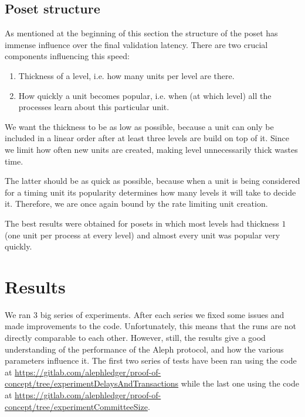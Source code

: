 \documentclass[a4paper,10pt]{article}
\begin{document}
		\subsection{Poset structure}
		 \label{ssec:posetShape}
			As mentioned at the beginning of this section the structure of the poset has immense influence over the final validation latency.
			There are two crucial components influencing this speed:
			\begin{enumerate}
				\item Thickness of a level, i.e. how many units per level are there.
				\item How quickly a unit becomes popular, i.e. when (at which level) all the processes learn about this particular unit.
			\end{enumerate}
			We want the thickness to be as low as possible, because a unit can only be included in a linear order after at least three levels are build on top of it.
			Since we limit how often new units are created, making level unnecessarily thick wastes time.

			The latter should be as quick as possible, because when a unit is being considered for a timing unit its popularity determines how many levels it will take to decide it.
		 Therefore, we are once again bound by the rate limiting unit creation.

			The best results were obtained for posets in which most levels had thickness $1$ (one unit per process at every level) and almost every unit was popular very quickly.
	\section{Results}
	 We ran 3 big series of experiments. After each series we fixed some issues and made improvements to the code.
		Unfortunately, this means that the runs are not directly comparable to each other.
		However, still, the results give a good understanding of the performance of the Aleph protocol, and how the various parameters influence it.
		The first two series of tests have been ran using the code at \url{https://gitlab.com/alephledger/proof-of-concept/tree/experimentDelaysAndTransactions}
		while the last one using the code at \url{https://gitlab.com/alephledger/proof-of-concept/tree/experimentCommitteeSize}.
\end{document}
